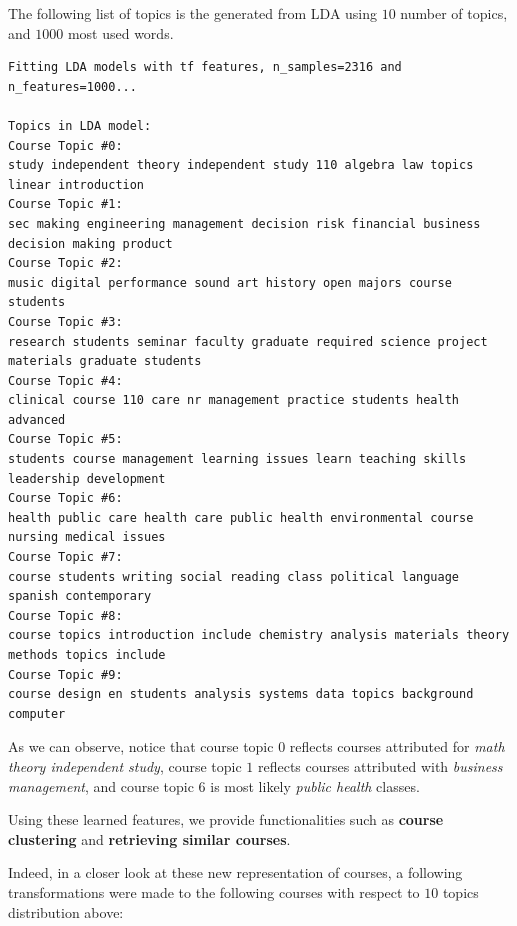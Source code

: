 \documentclass[twoside]{article}
\begin{document}
The following list of topics is the generated from LDA using $10$ number of topics, and $1000$ most used words.

\begin{verbatim}
Fitting LDA models with tf features, n_samples=2316 and n_features=1000...

Topics in LDA model:
Course Topic #0:
study independent theory independent study 110 algebra law topics linear introduction
Course Topic #1:
sec making engineering management decision risk financial business decision making product
Course Topic #2:
music digital performance sound art history open majors course students
Course Topic #3:
research students seminar faculty graduate required science project materials graduate students
Course Topic #4:
clinical course 110 care nr management practice students health advanced
Course Topic #5:
students course management learning issues learn teaching skills leadership development
Course Topic #6:
health public care health care public health environmental course nursing medical issues
Course Topic #7:
course students writing social reading class political language spanish contemporary
Course Topic #8:
course topics introduction include chemistry analysis materials theory methods topics include
Course Topic #9:
course design en students analysis systems data topics background computer
\end{verbatim}

As we can observe, notice that course topic $0$ reflects courses attributed for \textit{math theory independent study}, course topic $1$ reflects courses attributed with \textit{business management}, and course topic $6$ is most likely \textit{public health} classes.

Using these learned features, we provide functionalities such as \textbf{course clustering} and \textbf{retrieving similar courses}.

Indeed, in a closer look at these new representation of courses, a following transformations were made to the following courses with respect to $10$ topics distribution above:
\end{document}

